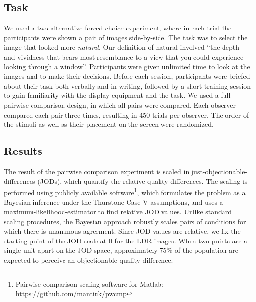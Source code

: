\documentclass[acmtog]{acmart}
\newcommand\customsection[1]{\subsection{#1}}
\begin{document}
\customsection{Task} We used a two-alternative forced choice experiment, where in each trial the participants were shown a pair of images side-by-side. The task was to select the image that looked more \emph{natural}. Our definition of natural involved ``the depth and vividness that bears most resemblance to a view that you could experience looking through a window''. Participants were given unlimited time to look at the images and to make their decisions. Before each session, participants were briefed about their task both verbally and in writing, followed by a short training session to gain familiarity with the display equipment and the task. We used a full pairwise comparison design, in which all pairs were compared. Each observer compared each pair three times, resulting in 450 trials per observer. The order of the stimuli as well as their placement on the screen were randomized.

\customsection{Results} The result of the pairwise comparison experiment is scaled in just-objectionable-differences (JODs), which quantify the relative quality differences. The scaling is performed using publicly available software\footnote{Pairwise comparison scaling software for Matlab: \url{https://github.com/mantiuk/pwcmp}}, which formulates the problem as a Bayesian inference under the Thurstone Case V assumptions, and uses a maximum-likelihood-estimator to find relative JOD values. Unlike standard scaling procedures, the Bayesian approach robustly scales pairs of conditions for which there is unanimous agreement. Since JOD values are relative, we fix the starting point of the JOD scale at 0 for the LDR images. When two points are a single unit apart on the JOD space, approximately 75\% of the population are expected to perceive an objectionable quality difference.
\end{document}
